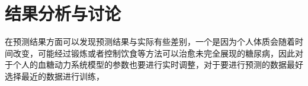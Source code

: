 \chapter{结果分析与讨论}

在预测结果方面可以发现预测结果与实际有些差别，一个是因为个人体质会随着时间改变，可能经过锻炼或者控制饮食等方法可以治愈未完全展现的糖尿病，因此对于个人的血糖动力系统模型的参数也要进行实时调整，对于要进行预测的数据最好选择最近的数据进行训练，
